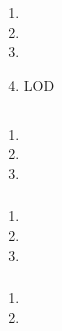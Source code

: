 \important{}

\begin{enumerate}
\def\labelenumi{\arabic{enumi}.}
\item
  \important{}
\item
  \important{}
\item
  \important{}
\item
  \important{}LOD
\end{enumerate}

\hypertarget{section-82}{%
\subsection{}\label{section-82}}

\hypertarget{section-83}{%
\subsubsection{}\label{section-83}}

\begin{enumerate}
\def\labelenumi{\arabic{enumi}.}
\tightlist
\item
\item
\item
\end{enumerate}

\hypertarget{section-84}{%
\subsubsection{}\label{section-84}}

\begin{enumerate}
\def\labelenumi{\arabic{enumi}.}
\tightlist
\item
\item
\item
\end{enumerate}

\hypertarget{section-85}{%
\subsubsection{}\label{section-85}}

\begin{enumerate}
\def\labelenumi{\arabic{enumi}.}
\tightlist
\item
\item
\end{enumerate}

\hypertarget{section-86}{%
\subsection{}\label{section-86}}

